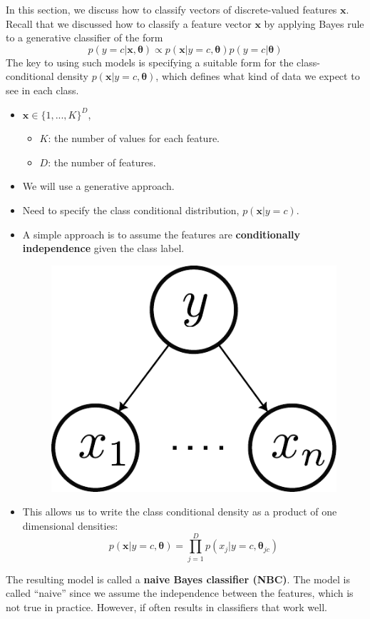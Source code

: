 In this section, we discuss how to classify vectors of discrete-valued features $\mathbf{x}$. Recall that we discussed how to classify a feature vector $\mathbf{x}$ by applying Bayes rule to a generative classifier of the form 
  $$p(y=c|\mathbf{x},\boldsymbol{\theta})\propto p(\mathbf{x}|y=c, \boldsymbol{\theta})p(y=c|\boldsymbol{\theta})$$
  The key to using such models is specifying a suitable form for the class-conditional density $p(\mathbf{x}|y=c, \boldsymbol{\theta})$, which defines what kind of data we expect to see in each class. 
  \begin{itemize}
    \item  $\textbf{x} \in \{1,...,K\}^D$,
    \begin{itemize}
      \item $K$: the number of values for each feature.
      \item $D$: the number of features.
    \end{itemize}
    \item We will use a generative approach.
    \item Need to specify the class conditional distribution, $p(\mathbf{x}|y=c)$.
    \item A simple approach is to assume the features are \textbf{conditionally independence} given the class label.
		\begin{figure}[h]
			\centering
			\includegraphics[scale=0.5]{./images/conditional_independence.pdf}
		\end{figure}
    \item This allows us to write the class conditional density as a product of one dimensional densities:
    $$p(\mathbf{x}|y=c, \boldsymbol{\theta}) = \prod_{j=1}^{D}p(x_j|y=c,\boldsymbol{\theta}_{jc})$$
  \end{itemize}
  The resulting model is called a \textbf{naive Bayes classifier (NBC)}. The model is called ``naive'' since we assume the independence between the features, which is not true in practice. However, if often results in classifiers that work well.

